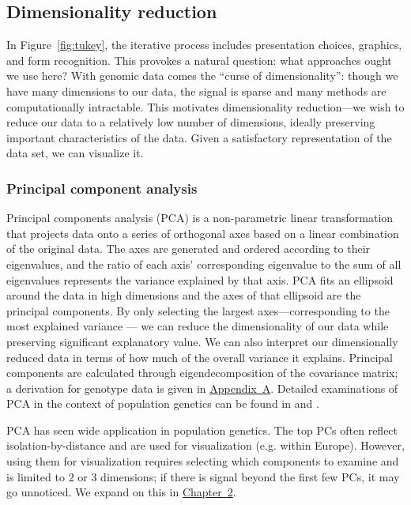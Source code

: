 \subsection{Dimensionality reduction}

In Figure~\ref{fig:tukey}, the iterative process includes presentation choices, graphics, and form recognition. This provokes a natural question: what approaches ought we use here? With genomic data comes the ``curse of dimensionality'': though we have many dimensions to our data, the signal is sparse and many methods are computationally intractable. This motivates dimensionality reduction---we wish to reduce our data to a relatively low number of dimensions, ideally preserving important characteristics of the data. Given a satisfactory representation of the data set, we can visualize it.

\subsubsection{Principal component analysis}

Principal components analysis (PCA) is a non-parametric linear transformation that projects data onto a series of orthogonal axes based on a linear combination of the original data. The axes are generated and ordered according to their eigenvalues, and the ratio of each axis' corresponding eigenvalue to the sum of all eigenvalues represents the variance explained by that axis. PCA fits an ellipsoid around the data in high dimensions and the axes of that ellipsoid are the principal components. By only selecting the largest axes---corresponding to the most explained variance --- we can reduce the dimensionality of our data while preserving significant explanatory value. We can also interpret our dimensionally reduced data in terms of how much of the overall variance it explains. Principal components are calculated through eigendecomposition of the covariance matrix; a derivation for genotype data is given in \hyperref[appendix:AppendixA]{Appendix~A}. Detailed examinations of PCA in the context of population genetics can be found in \citep{mcvean_genealogical_2009} and \cite{peter_geometric_2022}.

PCA has seen wide application in population genetics. The top PCs often reflect isolation-by-distance and are used for visualization (e.g. within Europe\citep{novembre2008europe}). However, using them for visualization requires selecting which components to examine and is limited to $2$ or $3$ dimensions; if there is signal beyond the first few PCs, it may go unnoticed. We expand on this in \hyperref[chap:chapter2]{Chapter~2}.

